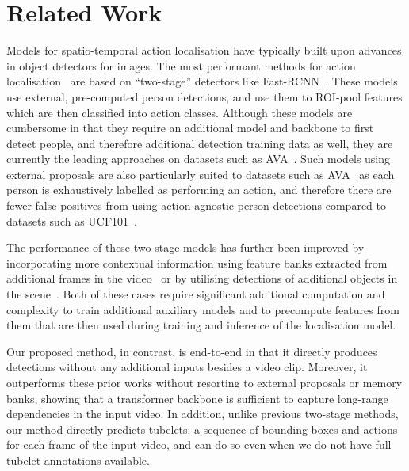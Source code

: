 \documentclass[10pt,twocolumn,letterpaper]{article}
\begin{document}
 \section{Related Work}

Models for spatio-temporal action localisation have typically built upon advances in object detectors for images.
The most performant methods for action localisation~\cite{pan2021actor,wu2022memvit,tang2020asynchronous,arnab2022beyond,feichtenhofer_iccv_2019} are based on ``two-stage'' detectors like Fast-RCNN~\cite{girshick_iccv_2015}. These models use external, pre-computed person detections, and use them to ROI-pool features which are then classified into action classes.
Although these models are cumbersome in that they require an additional model and backbone to first detect people, and therefore additional detection training data as well, they are currently the leading approaches on datasets such as AVA~\cite{gu_cvpr_2018}.
Such models using external proposals are also particularly suited to datasets such as AVA~\cite{gu_cvpr_2018} as each person is exhaustively labelled as performing an action, and therefore there are fewer false-positives from using action-agnostic person detections compared to datasets such as UCF101~\cite{soomro_arxiv_2012}.

The performance of these two-stage models has further been improved by incorporating more contextual information using feature banks extracted from additional frames in the video~\cite{wu2022memvit, pan2021actor, tang2020asynchronous, wu_cvpr_2019} or by utilising detections of additional objects in the scene~\cite{arnab2021unified, baradel_eccv_2018, zhang_tokmakov_cvpr_2019, wang_eccv_2018}.
Both of these cases require significant additional computation and complexity to train additional auxiliary models and to precompute features from them that are then used during training and inference of the localisation model.

Our proposed method, in contrast, is end-to-end in that it directly produces detections without any additional inputs besides a video clip.
Moreover, it outperforms these prior works without resorting to external proposals or memory banks, showing that a transformer backbone is sufficient to capture long-range dependencies in the input video.
In addition, unlike previous two-stage methods, our method directly predicts tubelets: a sequence of bounding boxes and actions for each frame of the input video, and can do so even when we do not have full tubelet annotations available.
\end{document}
